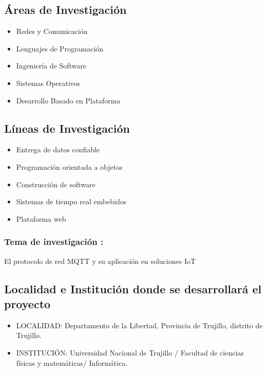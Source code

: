 \documentclass[a4paper, 12pt]{article}
\begin{document}
\subsection{Áreas de Investigación}
\begin{itemize}
\item Redes y Comunicación
\item Lenguajes de Programación
\item Ingeniería de Software
\item Sistemas Operativos
\item Desarrollo Basado en Plataforma
\end{itemize}
\subsection{Líneas de Investigación}
\begin{itemize}
\item Entrega de datos confiable
\item Programación orientada a objetos
\item Construcción de software
\item Sistemas de tiempo real embebidos
\item Plataforma web

\end{itemize}

               
\subsubsection{Tema de investigación :} 

El protocolo de red MQTT y su aplicación en soluciones IoT

\subsection{Localidad e Institución donde se desarrollará el proyecto }

\begin{itemize}

\item LOCALIDAD: 
Departamento de la Libertad, Provincia de Trujillo, distrito de Trujillo.

\item INSTITUCIÓN: 
Universidad Nacional de Trujillo / Facultad de ciencias físicas y matemáticas/ Informática.

\end{itemize}
\end{document}
